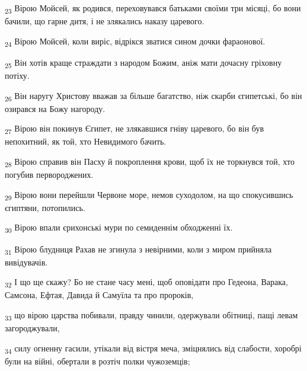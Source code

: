 \begin{tcolorbox}
\textsubscript{23} Вірою Мойсей, як родився, переховувався батьками своїми три місяці, бо вони бачили, що гарне дитя, і не злякались наказу царевого.
\end{tcolorbox}
\begin{tcolorbox}
\textsubscript{24} Вірою Мойсей, коли виріс, відрікся зватися сином дочки фараонової.
\end{tcolorbox}
\begin{tcolorbox}
\textsubscript{25} Він хотів краще страждати з народом Божим, аніж мати дочасну гріховну потіху.
\end{tcolorbox}
\begin{tcolorbox}
\textsubscript{26} Він наругу Христову вважав за більше багатство, ніж скарби єгипетські, бо він озирався на Божу нагороду.
\end{tcolorbox}
\begin{tcolorbox}
\textsubscript{27} Вірою він покинув Єгипет, не злякавшися гніву царевого, бо він був непохитний, як той, хто Невидимого бачить.
\end{tcolorbox}
\begin{tcolorbox}
\textsubscript{28} Вірою справив він Пасху й покроплення крови, щоб їх не торкнувся той, хто погубив первороджених.
\end{tcolorbox}
\begin{tcolorbox}
\textsubscript{29} Вірою вони перейшли Червоне море, немов суходолом, на що спокусившись єгиптяни, потопились.
\end{tcolorbox}
\begin{tcolorbox}
\textsubscript{30} Вірою впали єрихонські мури по семиденнім обходженні їх.
\end{tcolorbox}
\begin{tcolorbox}
\textsubscript{31} Вірою блудниця Рахав не згинула з невірними, коли з миром прийняла вивідувачів.
\end{tcolorbox}
\begin{tcolorbox}
\textsubscript{32} І що ще скажу? Бо не стане часу мені, щоб оповідати про Гедеона, Варака, Самсона, Ефтая, Давида й Самуїла та про пророків,
\end{tcolorbox}
\begin{tcolorbox}
\textsubscript{33} що вірою царства побивали, правду чинили, одержували обітниці, пащі левам загороджували,
\end{tcolorbox}
\begin{tcolorbox}
\textsubscript{34} силу огненну гасили, утікали від вістря меча, зміцнялись від слабости, хоробрі були на війні, обертали в розтіч полки чужоземців;
\end{tcolorbox}
